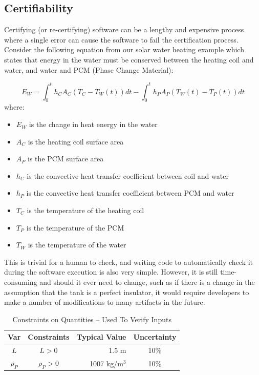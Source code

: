 \documentclass[sigconf]{acmart}
\newcommand{\authornt}[3]{\textcolor{#1}{[#3 ---#2]}}
\newcommand{\authornt}[3]{}
\newcommand{\wss}[1]{\authornt{blue}{SS}{#1}} %
\begin{document}
{\subsection{Certifiability}

Certifying (or re-certifying) software can be a lengthy and expensive process
where a single error can cause the software to fail the certification process.
Consider the following equation from our solar water heating example which
states that energy in the water must be conserved between the heating coil and
water, and water and PCM (Phase Change Material):

\begin{equation*}
E_W = \int_{0}^{t} h_C A_C (T_C - T_W(t)) dt - \int_{0}^{t} h_P A_P (T_W(t) - T_P(t)) dt
\end{equation*}
\noindent where:
\begin{itemize}
    \item $E_W$ is the change in heat energy in the water
    \item $A_C$ is the heating coil surface area
    \item $A_P$ is the PCM surface area
    \item $h_C$ is the convective heat transfer coefficient between coil and 
    water
    \item $h_P$ is the convective heat transfer coefficient between PCM and 
    water 
    \item $T_C$ is the temperature of the heating coil
    \item $T_P$ is the temperature of the PCM
    \item $T_W$ is the temperature of the water
\end{itemize}

This is trivial for a human to check, and writing code to automatically check it
during the software execution is also very simple. However, it is still
time-consuming and should it ever need to change, such as if there is a change
in the assumption that the tank is a perfect insulator, it would require
developers to make a number of modifications to many artifacts in the future.

\begin{table} 
\centering
\caption{Constraints on Quantities -- Used To Verify Inputs}
\begin{tabular}{c c r c } 
\toprule
\textbf{Var} & \textbf{Constraints} & \textbf{Typical Value} & \textbf{Uncertainty}\\ \midrule
$L$ & $L > 0$ & 1.5 m & 10\% \\ 
$\rho_P$ & $\rho_P > 0$    & 1007 kg/m$^3$    & 10\% \\
\bottomrule
\end{tabular}
\label{tab:pcm}
\end{table}

}
\end{document}
